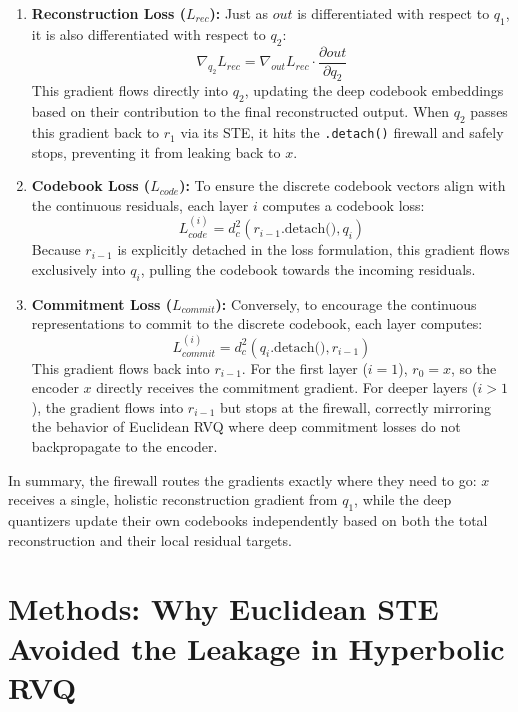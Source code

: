 \documentclass{article}
\begin{document}
\begin{enumerate}
    \item \textbf{Reconstruction Loss ($L_{rec}$):} Just as $out$ is differentiated with respect to $q_1$, it is also differentiated with respect to $q_2$:
    \begin{equation}
        \nabla_{q_2} L_{rec} = \nabla_{out} L_{rec} \cdot \frac{\partial out}{\partial q_2}
    \end{equation}
    This gradient flows directly into $q_2$, updating the deep codebook embeddings based on their contribution to the final reconstructed output. When $q_2$ passes this gradient back to $r_1$ via its STE, it hits the \texttt{.detach()} firewall and safely stops, preventing it from leaking back to $x$.
    
    \item \textbf{Codebook Loss ($L_{code}$):} To ensure the discrete codebook vectors align with the continuous residuals, each layer $i$ computes a codebook loss:
    \begin{equation}
        L_{code}^{(i)} = d_c^2(r_{i-1}\text{.detach()}, q_i)
    \end{equation}
    Because $r_{i-1}$ is explicitly detached in the loss formulation, this gradient flows exclusively into $q_i$, pulling the codebook towards the incoming residuals.
    
    \item \textbf{Commitment Loss ($L_{commit}$):} Conversely, to encourage the continuous representations to commit to the discrete codebook, each layer computes:
    \begin{equation}
        L_{commit}^{(i)} = d_c^2(q_i\text{.detach()}, r_{i-1})
    \end{equation}
    This gradient flows back into $r_{i-1}$. For the first layer ($i=1$), $r_0 = x$, so the encoder $x$ directly receives the commitment gradient. For deeper layers ($i > 1$), the gradient flows into $r_{i-1}$ but stops at the firewall, correctly mirroring the behavior of Euclidean RVQ where deep commitment losses do not backpropagate to the encoder.
\end{enumerate}

In summary, the firewall routes the gradients exactly where they need to go: $x$ receives a single, holistic reconstruction gradient from $q_1$, while the deep quantizers update their own codebooks independently based on both the total reconstruction and their local residual targets.


\section*{Methods: Why Euclidean STE Avoided the Leakage in Hyperbolic RVQ}
\end{document}
